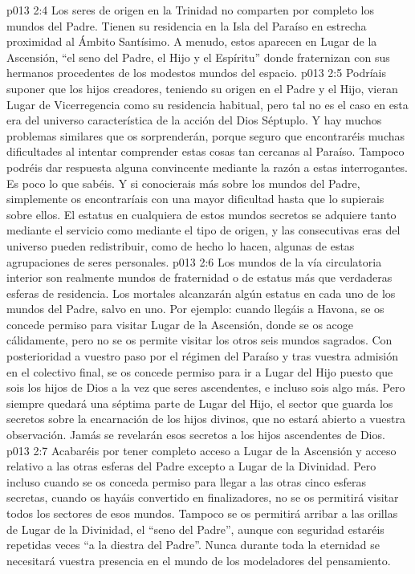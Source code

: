 \vs p013 2:4 \pc Los seres de origen en la Trinidad no comparten por completo los mundos del Padre. Tienen su residencia en la Isla del Paraíso en estrecha proximidad al Ámbito Santísimo. A menudo, estos aparecen en Lugar de la Ascensión, “el seno del Padre, el Hijo y el Espíritu” donde fraternizan con sus hermanos procedentes de los modestos mundos del espacio.
\vs p013 2:5 \pc Podríais suponer que los hijos creadores, teniendo su origen en el Padre y el Hijo, vieran Lugar de Vicerregencia como su residencia habitual, pero tal no es el caso en esta era del universo característica de la acción del Dios Séptuplo. Y hay muchos problemas similares que os sorprenderán, porque seguro que encontraréis muchas dificultades al intentar comprender estas cosas tan cercanas al Paraíso. Tampoco podréis dar respuesta alguna convincente mediante la razón a estas interrogantes. Es poco lo que sabéis. Y si conocierais más sobre los mundos del Padre, simplemente os encontraríais con una mayor dificultad hasta que lo supierais  sobre ellos. El estatus en cualquiera de estos mundos secretos se adquiere tanto mediante el servicio como mediante el tipo de origen, y las consecutivas eras del universo pueden redistribuir, como de hecho lo hacen, algunas de estas agrupaciones de seres personales.
\vs p013 2:6 \pc Los mundos de la vía circulatoria interior son realmente mundos de fraternidad o de estatus más que verdaderas esferas de residencia. Los mortales alcanzarán algún estatus en cada uno de los mundos del Padre, salvo en uno. Por ejemplo: cuando llegáis a Havona, se os concede permiso para visitar Lugar de la Ascensión, donde se os acoge cálidamente, pero no se os permite visitar los otros seis mundos sagrados. Con posterioridad a vuestro paso por el régimen del Paraíso y tras vuestra admisión en el colectivo final, se os concede permiso para ir a Lugar del Hijo puesto que sois los hijos de Dios a la vez que seres ascendentes, e incluso sois algo más. Pero siempre quedará una séptima parte de Lugar del Hijo, el sector que guarda los secretos sobre la encarnación de los hijos divinos, que no estará abierto a vuestra observación. Jamás se revelarán esos secretos a los hijos ascendentes de Dios.
\vs p013 2:7 Acabaréis por tener completo acceso a Lugar de la Ascensión y acceso relativo a las otras esferas del Padre excepto a Lugar de la Divinidad. Pero incluso cuando se os conceda permiso para llegar a las otras cinco esferas secretas, cuando os hayáis convertido en finalizadores, no se os permitirá visitar todos los sectores de esos mundos. Tampoco se os permitirá arribar a las orillas de Lugar de la Divinidad, el “seno del Padre”, aunque con seguridad estaréis repetidas veces “a la diestra del Padre”. Nunca durante toda la eternidad se necesitará vuestra presencia en el mundo de los modeladores del pensamiento.
